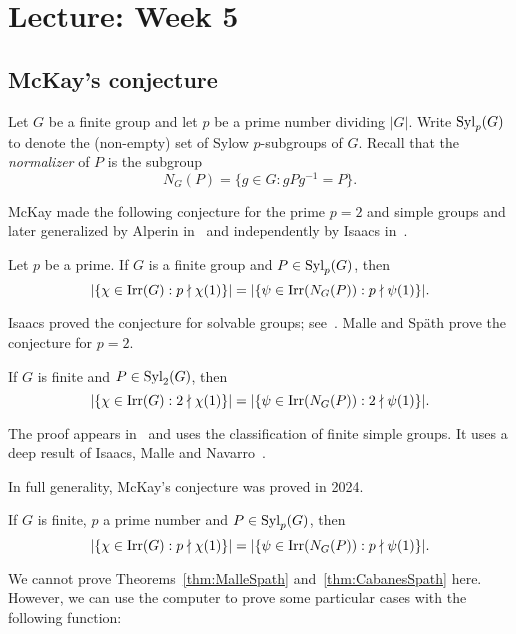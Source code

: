 \section{Lecture: Week 5}

\subsection{McKay's conjecture}
\label{McKay}

Let $G$ be a finite group and let $p$ be a prime number dividing
$|G|$. Write $\mathrm{Syl}_p(G)$ to denote the (non-empty) set of Sylow 
$p$-subgroups of $G$. Recall that 
the \emph{normalizer} of $P$ is the subgroup
\[
N_G(P)=\{g\in G:gPg^{-1}=P\}.
\]

McKay made the following conjecture for the prime $p=2$ and simple groups 
and later generalized by Alperin in~\cite{MR0404417} and independently
by Isaacs in~\cite{MR332945}. 

\begin{conjecture}[McKay]
\label{conjecture:McKay}
Let $p$ be a prime. If  
$G$ is a finite group and $P\in\mathrm{Syl}_p(G)$, then 
\[
|\{\chi\in\operatorname{Irr}(G): p\nmid \chi(1)\}|
=|\{\psi\in\operatorname{Irr}(N_G(P)): p\nmid\psi(1)\}|.
\]
\end{conjecture}

Isaacs 
proved the conjecture for solvable groups; see~\cite{MR332945,MR3791517}. 
Malle and Sp\"ath prove the conjecture for $p=2$. 

\begin{theorem}
\label{thm:MalleSpath}
If $G$ is finite and $P\in\mathrm{Syl}_2(G)$,
then 
\[
|\{\chi\in\operatorname{Irr}(G): 2\nmid \chi(1)\}|
=|\{\psi\in\operatorname{Irr}(N_G(P)): 2\nmid\psi(1)\}|.
\]
\end{theorem}

The proof appears in~\cite{MR3549625} and uses the classification of 
finite simple groups. It uses a deep result of 
Isaacs, Malle and Navarro~\cite{MR2336079}. 

In full generality, McKay's conjecture was
proved in 2024. 

\begin{theorem}
\label{thm:CabanesSpath}
If $G$ is finite, $p$ a prime number 
and $P\in\mathrm{Syl}_p(G)$,
then 
\[
|\{\chi\in\operatorname{Irr}(G): p\nmid \chi(1)\}|
=|\{\psi\in\operatorname{Irr}(N_G(P)): p\nmid\psi(1)\}|.
\]
\end{theorem}

We cannot prove Theorems~\ref{thm:MalleSpath} and~\ref{thm:CabanesSpath} here. However, 
we can use the computer to prove some particular cases
with the following function: 

